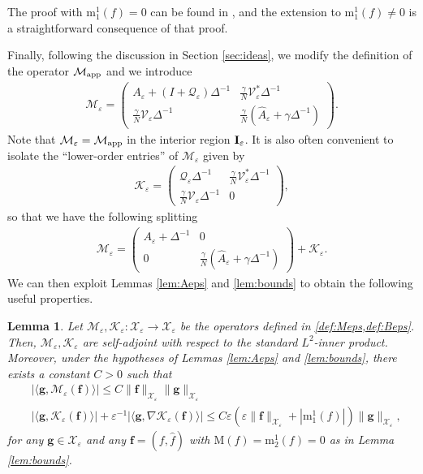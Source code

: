 \documentclass[11pt,reqno,a4paper]{amsart}
\def\eps{\varepsilon}
\newcommand{\cK}{\mathcal{K}}
\newcommand{\cM}{\mathcal{M}}
\newcommand{\cQ}{\mathcal{Q}}
\newcommand{\cV}{\mathcal{V}}
\newcommand{\cX}{\mathcal{X}}
\newcommand{\mrm}{\mathrm{m}}
\newcommand{\mrM}{\mathrm{M}}
\newcommand{\1}{\mathbbm{1}}
\newtheorem{lemma}[proposition]{Lemma}
\theoremstyle{definition}
\theoremstyle{definition}
\numberwithin{equation}{section}
\begin{document}
The proof with $\mrm_1^1(f)=0$ can be found in \cite[Section A.4]{dolce2024long}, and the extension to $\mrm^1_1(f)\neq 0$ is a straightforward consequence of that proof.

Finally, following the discussion in Section \ref{sec:ideas}, we modify the definition of the operator $\cM_{\rm app}$ and we introduce
\begin{align}
\label{def:Meps}
\cM_{\eps}=\begin{pmatrix}
       A_\eps+(I+\cQ_{\eps})\Delta^{-1}& \frac{\gamma}{N} \cV^*_{\eps}\Delta^{-1}
       \\[6pt]
       \frac{\gamma}{N}\cV_{\eps}\Delta^{-1}
        &\frac{\gamma}{N}(\widehat{A}_\eps+\gamma\Delta^{-1})
\end{pmatrix}.
 \end{align}
 Note that  $\cM_\eps=\cM_{\rm app}$ in the interior region $\boldsymbol{\rm I}_\eps$.
 It is also often convenient to isolate the ``lower-order entries'' of $\cM_\eps$  given by 
\begin{align}
\label{def:Beps}
\cK_{\eps}=\begin{pmatrix}
      \cQ_{\eps}\Delta^{-1}& \frac{\gamma}{N} \cV^*_{\eps}\Delta^{-1}
       \\[6pt]
       \frac{\gamma}{N}\cV_{\eps}\Delta^{-1}
        &0
\end{pmatrix},
 \end{align}
 so that we have the following splitting 
     \begin{align}
    \label{eq:splitMeps}
        \cM_{\eps}=\begin{pmatrix}
       A_\eps+\Delta^{-1}& 0
       \\[6pt]
       0
        &\frac{\gamma}{N}(\widehat{A}_\eps+\gamma\Delta^{-1})
\end{pmatrix}+\cK_{\eps}.
    \end{align}
We can then exploit  Lemmas \ref{lem:Aeps} and \ref{lem:bounds} to obtain the following useful properties.
\begin{lemma}
\label{lem:MepsBeps}
Let $\cM_{\eps},\cK_{\eps}:\boldsymbol{\cX}_\eps\to \boldsymbol{\cX}_\eps$ be the operators defined in \cref{def:Meps,def:Beps}. Then, $\cM_{\eps},\cK_{\eps}$ are self-adjoint with respect to the standard $L^2$-inner product. Moreover, under the hypotheses of Lemmas \ref{lem:Aeps} and \ref{lem:bounds}, there exists a constant $C>0$ such that
  \begin{align}
  \label{bd:MB0}&|\langle {\mathbf g},\cM_{\eps}({\mathbf f})\rangle|\leq C \|{\mathbf f}\|_{\boldsymbol{\cX}_\eps}\|{\mathbf g}\|_{\boldsymbol{\cX}_\eps}\\
  \label{bd:MB}&|\langle {\mathbf g},\cK_{\eps}({\mathbf f})\rangle|+\eps^{-1}|\langle {\mathbf g},\nabla\cK_{\eps}({\mathbf f})\rangle|\leq C\eps(\eps \|{\mathbf f}\|_{\boldsymbol{\cX}_\eps}+|\mrm_1^1(f)|)\|{\mathbf g}\|_{\boldsymbol{\cX}_\eps},
\end{align}
for any ${\mathbf g}\in \boldsymbol{\cX}_{\eps}$ and any ${\mathbf f}=(f,\widehat{f})$ with $\mrM(f)=\mrm^1_2(f)=0$ as in Lemma \ref{lem:bounds}.
\end{lemma}
\end{document}
